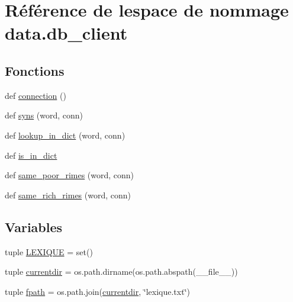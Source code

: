 \hypertarget{namespacedata_1_1db__client}{}\section{Référence de l\textquotesingle{}espace de nommage data.\+db\+\_\+client}
\label{namespacedata_1_1db__client}
\subsection*{Fonctions}
\begin{DoxyCompactItemize}
\item 
def \hyperlink{namespacedata_1_1db__client_a008dea6122d1f3f9fdcb40c29be4ca68}{connection} ()
\item 
def \hyperlink{namespacedata_1_1db__client_a2299c681d97d8e31ed0b225d20ce5168}{syns} (word, conn)
\item 
def \hyperlink{namespacedata_1_1db__client_ae93ca1ff0f3f632e12b3af611bf2e2d3}{lookup\+\_\+in\+\_\+dict} (word, conn)
\item 
def \hyperlink{namespacedata_1_1db__client_a7b136a839083392c4af24566c7f7b539}{is\+\_\+in\+\_\+dict}
\item 
def \hyperlink{namespacedata_1_1db__client_a2363c86a754a8206d7076c5d194db3db}{same\+\_\+poor\+\_\+rimes} (word, conn)
\item 
def \hyperlink{namespacedata_1_1db__client_a4905fcb6a47b20a0385b354c50350d4c}{same\+\_\+rich\+\_\+rimes} (word, conn)
\end{DoxyCompactItemize}
\subsection*{Variables}
\begin{DoxyCompactItemize}
\item 
tuple \hyperlink{namespacedata_1_1db__client_ac9dbcfd3eaa0b02a22dcb2174970560b}{L\+E\+X\+I\+Q\+U\+E} = set()
\item 
tuple \hyperlink{namespacedata_1_1db__client_afa489c1bbe26cbfea0212c193f37443a}{currentdir} = os.\+path.\+dirname(os.\+path.\+abspath(\+\_\+\+\_\+file\+\_\+\+\_\+))
\item 
tuple \hyperlink{namespacedata_1_1db__client_a0bc1de8f09afba462321b07612578a10}{fpath} = os.\+path.\+join(\hyperlink{namespacedata_1_1db__client_afa489c1bbe26cbfea0212c193f37443a}{currentdir}, \char`\"{}lexique.\+txt\char`\"{})
\end{DoxyCompactItemize}


